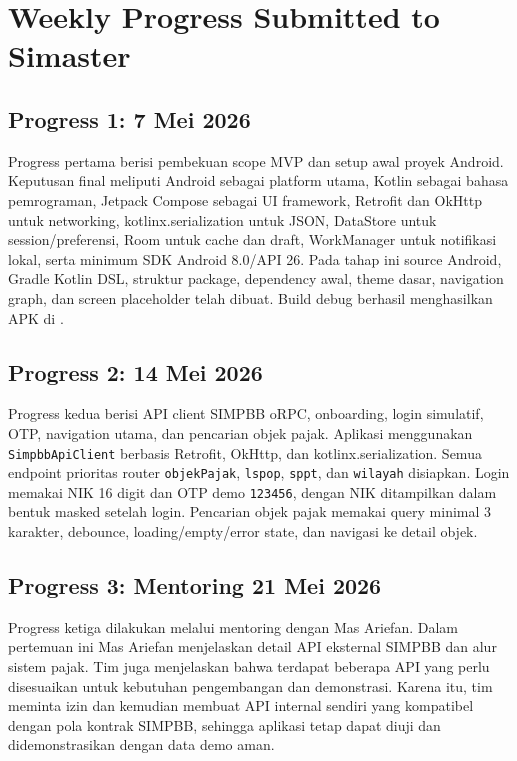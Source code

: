 \documentclass[conference]{report-assets/ref/IEEE-conference-template-062824/IEEEtran}
\begin{document}
\appendices

\section{Weekly Progress Submitted to Simaster}
\subsection{Progress 1: 7 Mei 2026}
Progress pertama berisi pembekuan scope MVP dan setup awal proyek Android. Keputusan final meliputi Android sebagai platform utama, Kotlin sebagai bahasa pemrograman, Jetpack Compose sebagai UI framework, Retrofit dan OkHttp untuk networking, kotlinx.serialization untuk JSON, DataStore untuk session/preferensi, Room untuk cache dan draft, WorkManager untuk notifikasi lokal, serta minimum SDK Android 8.0/API 26. Pada tahap ini source Android, Gradle Kotlin DSL, struktur package, dependency awal, theme dasar, navigation graph, dan screen placeholder telah dibuat. Build debug berhasil menghasilkan APK di .

\subsection{Progress 2: 14 Mei 2026}
Progress kedua berisi API client SIMPBB oRPC, onboarding, login simulatif, OTP, navigation utama, dan pencarian objek pajak. Aplikasi menggunakan \texttt{SimpbbApiClient} berbasis Retrofit, OkHttp, dan kotlinx.serialization. Semua endpoint prioritas router \texttt{objekPajak}, \texttt{lspop}, \texttt{sppt}, dan \texttt{wilayah} disiapkan. Login memakai NIK 16 digit dan OTP demo \texttt{123456}, dengan NIK ditampilkan dalam bentuk masked setelah login. Pencarian objek pajak memakai query minimal 3 karakter, debounce, loading/empty/error state, dan navigasi ke detail objek.

\subsection{Progress 3: Mentoring 21 Mei 2026}
Progress ketiga dilakukan melalui mentoring dengan Mas Ariefan. Dalam pertemuan ini Mas Ariefan menjelaskan detail API eksternal SIMPBB dan alur sistem pajak. Tim juga menjelaskan bahwa terdapat beberapa API yang perlu disesuaikan untuk kebutuhan pengembangan dan demonstrasi. Karena itu, tim meminta izin dan kemudian membuat API internal sendiri yang kompatibel dengan pola kontrak SIMPBB, sehingga aplikasi tetap dapat diuji dan didemonstrasikan dengan data demo aman.
\end{document}
